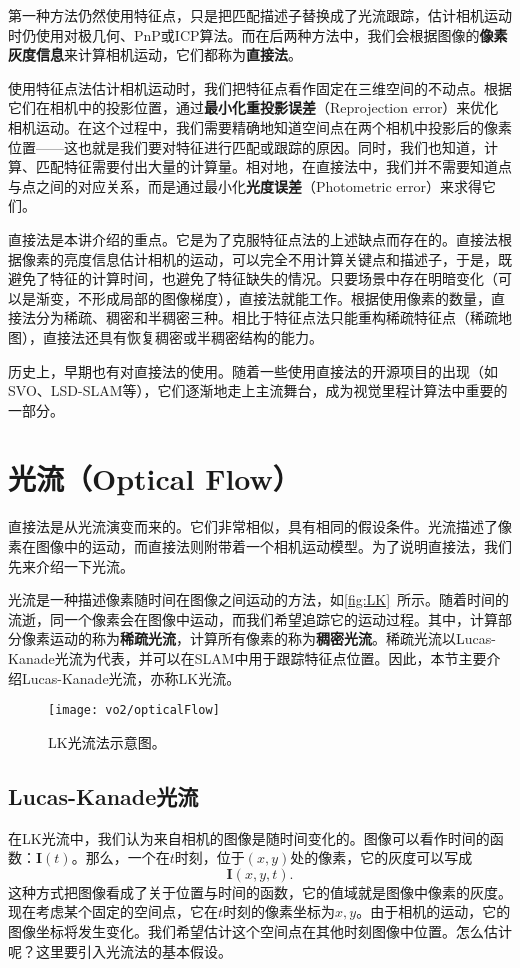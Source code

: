第一种方法仍然使用特征点，只是把匹配描述子替换成了光流跟踪，估计相机运动时仍使用对极几何、PnP或ICP算法。而在后两种方法中，我们会根据图像的\textbf{像素灰度信息}来计算相机运动，它们都称为\textbf{直接法}。

使用特征点法估计相机运动时，我们把特征点看作固定在三维空间的不动点。根据它们在相机中的投影位置，通过\textbf{最小化重投影误差}（Reprojection error）来优化相机运动。在这个过程中，我们需要精确地知道空间点在两个相机中投影后的像素位置——这也就是我们要对特征进行匹配或跟踪的原因。同时，我们也知道，计算、匹配特征需要付出大量的计算量。相对地，在直接法中，我们并不需要知道点与点之间的对应关系，而是通过最小化\textbf{光度误差}（Photometric error）来求得它们。

直接法是本讲介绍的重点。它是为了克服特征点法的上述缺点而存在的。直接法根据像素的亮度信息估计相机的运动，可以完全不用计算关键点和描述子，于是，既避免了特征的计算时间，也避免了特征缺失的情况。只要场景中存在明暗变化（可以是渐变，不形成局部的图像梯度），直接法就能工作。根据使用像素的数量，直接法分为稀疏、稠密和半稠密三种。相比于特征点法只能重构稀疏特征点（稀疏地图），直接法还具有恢复稠密或半稠密结构的能力。

历史上，早期也有对直接法的使用\textsuperscript{\cite{Silveira2008}}。随着一些使用直接法的开源项目的出现（如SVO\textsuperscript{\cite{Forster2014}}、LSD-SLAM\textsuperscript{\cite{Engel2014}}等），它们逐渐地走上主流舞台，成为视觉里程计算法中重要的一部分。

\section{光流（Optical Flow）}
直接法是从光流演变而来的。它们非常相似，具有相同的假设条件。光流描述了像素在图像中的运动，而直接法则附带着一个相机运动模型。为了说明直接法，我们先来介绍一下光流。

光流是一种描述像素随时间在图像之间运动的方法，如\autoref{fig:LK}~所示。随着时间的流逝，同一个像素会在图像中运动，而我们希望追踪它的运动过程。其中，计算部分像素运动的称为\textbf{稀疏光流}，计算所有像素的称为\textbf{稠密光流}。稀疏光流以Lucas-Kanade光流为代表，并可以在SLAM中用于跟踪特征点位置。因此，本节主要介绍Lucas-Kanade光流，亦称LK光流。

\begin{figure}[!htp]
	\centering
	\texttt{[image: vo2/opticalFlow]}
	\caption{LK光流法示意图。}
	\label{fig:LK}
\end{figure}

\subsection*{Lucas-Kanade光流}
在LK光流中，我们认为来自相机的图像是随时间变化的。图像可以看作时间的函数：$\bm{I}(t)$。那么，一个在$t$时刻，位于$(x,y)$处的像素，它的灰度可以写成
\[
\bm{I}(x,y,t).
\]
这种方式把图像看成了关于位置与时间的函数，它的值域就是图像中像素的灰度。现在考虑某个固定的空间点，它在$t$时刻的像素坐标为$x,y$。由于相机的运动，它的图像坐标将发生变化。我们希望估计这个空间点在其他时刻图像中位置。怎么估计呢？这里要引入光流法的基本假设。

